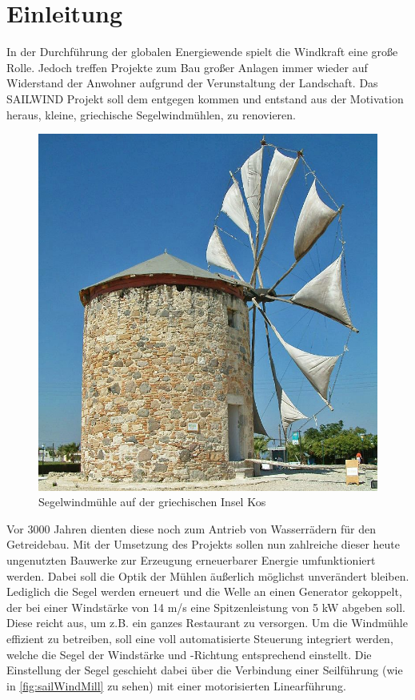 \newpage
\section{Einleitung}
In der Durchführung der globalen Energiewende spielt die Windkraft eine große Rolle. Jedoch treffen Projekte zum Bau großer Anlagen immer wieder auf Widerstand der Anwohner aufgrund der Verunstaltung der Landschaft. Das SAILWIND Projekt soll dem entgegen kommen und entstand aus der Motivation heraus, kleine, griechische Segelwindmühlen, zu renovieren. 
\begin{figure}[H]
	\centering
	\includegraphics[width=0.6\linewidth]{images/Sailwind/greekSailWindMill.jpg}
	\caption[Segelwindmühle auf der griechischen Insel Kos]{Segelwindmühle auf der griechischen Insel Kos \protect\cite{windMill}}
	\label{fig:sailWindMill}
\end{figure}
\noindent
Vor 3000 Jahren dienten diese noch zum Antrieb von Wasserrädern für den Getreidebau. Mit der Umsetzung des Projekts sollen nun zahlreiche dieser heute ungenutzten Bauwerke zur Erzeugung erneuerbarer Energie umfunktioniert werden. Dabei soll die Optik der Mühlen äußerlich möglichst unverändert bleiben. Lediglich die Segel werden erneuert und die Welle an einen Generator gekoppelt, der bei einer Windstärke von 14 m/s eine Spitzenleistung von 5 kW abgeben soll. Diese reicht aus, um z.B. ein ganzes Restaurant zu versorgen. \cite{industrProjektSailwind} Um die Windmühle effizient zu betreiben, soll eine voll automatisierte Steuerung integriert werden, welche die Segel der Windstärke und -Richtung entsprechend einstellt. Die Einstellung der Segel geschieht dabei über die Verbindung einer Seilführung (wie in \autoref{fig:sailWindMill} zu sehen) mit einer motorisierten Linearführung.
